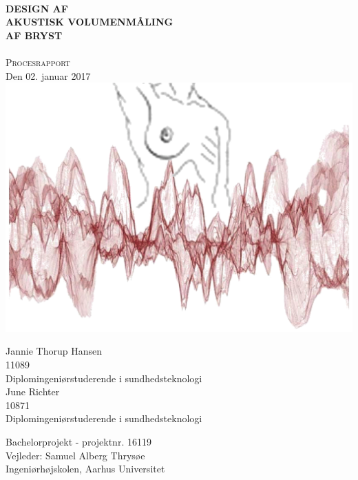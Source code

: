
\thispagestyle{empty}	
\begin{center}
			\HRule{0.5pt} \\										%
			\LARGE \textbf{\uppercase{Design af\\ akustisk volumenmåling\\ af bryst}} \\	%
			\HRule{2pt} \\ [0.5cm]								%
			
			\normalsize \textsc{Procesrapport}\\
			 Den 02. januar 2017 \\

			
			\vspace{1.5cm}
	\includegraphics[width=5.5in]{forside.png}	


\begin{multicols}{2}
Jannie Thorup Hansen\\
11089\\
Diplomingeniørstuderende i sundhedsteknologi\\
\columnbreak
June Richter\\
10871\\
Diplomingeniørstuderende i sundhedsteknologi\\
\end{multicols}

		Bachelorprojekt - projektnr. 16119\\
		Vejleder: Samuel Alberg Thrysøe\\
		Ingeniørhøjskolen, Aarhus Universitet\\	
\end{center}


